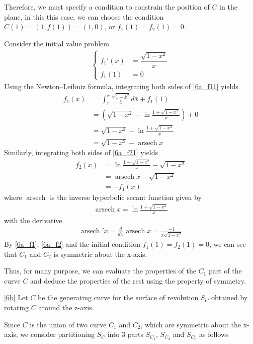 \documentclass[a4paper]{report}
\DeclareMathOperator{\arsech}{arsech}
\begin{document}
Therefore, we must specify a condition to constrain the position of $C$ in the plane, in this this case, we can choose the condition $C(1) = (1,f(1)) = (1,0)$, or $f_1(1) = f_2(1) = 0$.

Consider the initial value problem
\begin{align}
	\begin{cases}
	f_1'(x) &= \dfrac{\sqrt{1 - x^2}}{x}\\
	f_1(1) &= 0
	\end{cases}
\end{align}
Using the Newton–Leibniz formula, integrating both sides of \eqref{6a_f11} yields
\begin{align}
	f_1(x) &= \int_{1}^{x} \frac{\sqrt{1 - \bar{x}^2}}{\bar{x}} d\bar{x} + f_1(1)\\
	&= \left(\sqrt{1 - x^2} - \ln\frac{1 + \sqrt{1 - x^2}}{x}\right) + 0\\
	&= \sqrt{1 - x^2} - \ln\frac{1 + \sqrt{1 - x^2}}{x}\\
	&= \sqrt{1 - x^2} - \arsech x \label{6a_f1}
\end{align}
Similarly, integrating both sides of \eqref{6a_f21} yields
\begin{align}
f_2(x) &= \ln\frac{1 + \sqrt{1 - x^2}}{x} - \sqrt{1 - x^2}\\
&= \arsech x - \sqrt{1 - x^2}\\
&= - f_1(x)\label{6a_f2}
\end{align}
where $\arsech$ is the inverse hyperbolic secant function given by
\begin{align}
	\arsech x = \ln\frac{1 + \sqrt{1 - x^2}}{x}
\end{align}
with the derivative
\begin{align}
	\arsech' x = \frac{d}{dx} \arsech x = \frac{-1}{x\sqrt{1 - x^2}}
\end{align}
By \eqref{6a_f1}, \eqref{6a_f2} and the initial condition $f_1(1) = f_2(1) = 0$, we can see that $C_1$ and $C_2$ is symmetric about the x-axis.

Thus, for many purpose, we can evaluate the properties of the $C_1$ part of the curve $C$ and deduce the properties of the rest using the property of symmetry.

\newpage
\ref{6b} Let $C$ be the generating curve for the surface of revolution $S_C$ obtained by rotating $C$ around the z-axis.

Since $C$ is the union of two curve $C_1$ and $C_2$, which are symmetric about the x-axis, we consider partitioning $S_C$ into 3 parts $S_{C_1}$, $S_{C_2}$ and $S_{C_0}$ as follows
\end{document}
